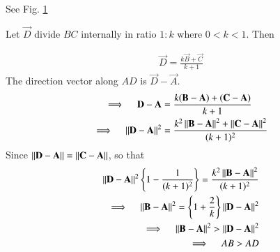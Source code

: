 See Fig. \ref{trifig1:solutions/1/19/}

Let $\vec{D}$ divide $BC$ internally in ratio $1:k$ where $0<k<1$. Then

\begin{figure}[!h]
\resizebox{\columnwidth}{!}{

}
        \caption{}  
\label{trifig1:solutions/1/19/}
\end{figure}

\begin{align}
	\vec{D} = \frac{k\vec{B}+\vec{C}}{k+1} 
\end{align}
The direction vector along $AD$ is $\vec{D}-\vec{A}$.
\begin{align}
	\implies \quad
	\mathbf{D-A} &= \frac{k(\mathbf{B}-\mathbf{A})+(\mathbf{C}-\mathbf{A})}{k+1} 
	\\
	\implies \quad
	\left\lVert\mathbf{D-A}\right\rVert^2 &= \frac{k^2 \left\lVert\mathbf{B-A}\right\rVert^2
		+ \left\lVert\mathbf{C-A}\right\rVert^2}{(k+1)^2}
\end{align}
	Since $\left\lVert\mathbf{D-A}\right\rVert = \left\lVert\mathbf{C-A}\right\rVert$, so that
\begin{align}
	\left\lVert\mathbf{D-A}\right\rVert^2 \left\{1-\frac{1}{(k+1)^2} \right\} 
		= \frac{k^2 \left\lVert\mathbf{B-A}\right\rVert^2}{(k+1)^2} 
	\\
	\implies \quad
	\left\lVert\mathbf{B-A}\right\rVert^2 = \left\{1+\frac{2}{k}\right\} \left\lVert\mathbf{D-A}\right\rVert^2
	\\
	\implies \quad
	\left\lVert\mathbf{B-A}\right\rVert^2 > \left\lVert\mathbf{D-A}\right\rVert^2
	\\
	\implies \quad AB > AD
\end{align}
